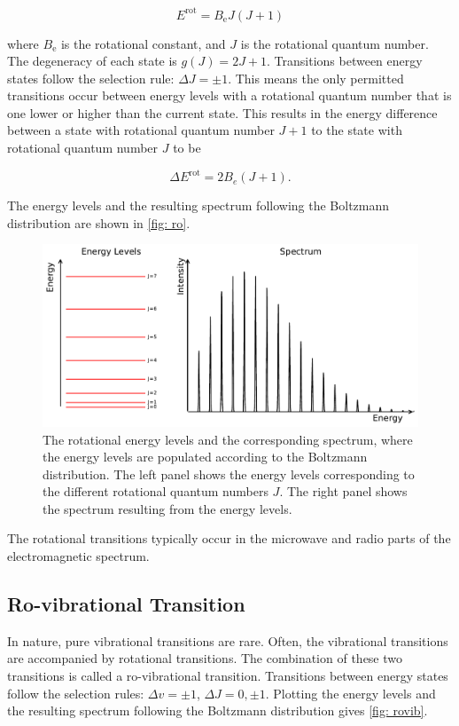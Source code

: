 \documentclass[oneside, single, authoryear, semicolon, 12pt]{lion-msc}
\newcommand{\4}{$_4$}
\newcommand{\3}{$_3$}
\newcommand{\2}{$_2$}
\begin{document}
\begin{equation}
    E^{\mathrm{rot}}=B_\mathrm{e}J(J+1)
\end{equation}

where $B_\mathrm{e}$ is the rotational constant, and $J$ is the rotational quantum number. 
The degeneracy of each state is $g(J)=2J+1$. Transitions between energy states follow the selection rule: $\Delta J=\pm 1$. This means the only permitted transitions occur between energy levels with a rotational quantum number that is one lower or higher than the current state. This results in the energy difference between a state with rotational quantum number $J+1$ to the state with rotational quantum number $J$ to be

\begin{equation}
    \Delta  E^{\mathrm{rot}}=2B_e(J+1).
\end{equation}

The energy levels and the resulting spectrum following the Boltzmann distribution are shown in \autoref{fig: ro}.

\begin{figure}[H]
    \centering
    \includegraphics[width=0.9\linewidth]{Figures/RoSpectrum.pdf}
    \caption{The rotational energy levels and the corresponding spectrum, where the energy levels are populated according to the Boltzmann distribution. The left panel shows the energy levels corresponding to the different rotational quantum numbers $J$. The right panel shows the spectrum resulting from the energy levels.}
    \label{fig: ro}
\end{figure}

The rotational transitions typically occur in the microwave and radio parts of the electromagnetic spectrum.

\subsection{Ro-vibrational Transition}
In nature, pure vibrational transitions are rare. Often, the vibrational transitions are accompanied by rotational transitions. The combination of these two transitions is called a ro-vibrational transition. Transitions between energy states follow the selection rules: $\Delta v=\pm 1$, $\Delta J=0, \pm 1$. Plotting the energy levels and the resulting spectrum following the Boltzmann distribution gives \autoref{fig: rovib}.
\end{document}
